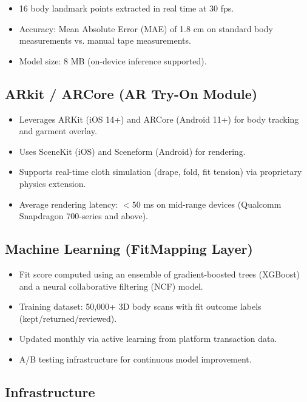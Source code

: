 \documentclass[12pt,a4paper]{article}
\begin{document}
\begin{itemize}
    \item 16 body landmark points extracted in real time at 30 fps.
    \item Accuracy: Mean Absolute Error (MAE) of 1.8 cm on standard body measurements vs. manual tape measurements.
    \item Model size: 8 MB (on-device inference supported).
\end{itemize}

\subsection{ARkit / ARCore (AR Try-On Module)}

\begin{itemize}
    \item Leverages ARKit (iOS 14+) and ARCore (Android 11+) for body tracking and garment overlay.
    \item Uses SceneKit (iOS) and Sceneform (Android) for rendering.
    \item Supports real-time cloth simulation (drape, fold, fit tension) via proprietary physics extension.
    \item Average rendering latency: $< 50$ ms on mid-range devices (Qualcomm Snapdragon 700-series and above).
\end{itemize}

\subsection{Machine Learning (FitMapping Layer)}

\begin{itemize}
    \item Fit score computed using an ensemble of gradient-boosted trees (XGBoost) and a neural collaborative filtering (NCF) model.
    \item Training dataset: 50,000+ 3D body scans with fit outcome labels (kept/returned/reviewed).
    \item Updated monthly via active learning from platform transaction data.
    \item A/B testing infrastructure for continuous model improvement.
\end{itemize}

\subsection{Infrastructure}
\end{document}
